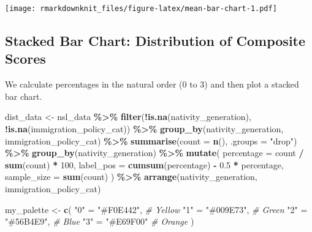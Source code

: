 \documentclass[
]{article}
\newenvironment{Shaded}{\begin{snugshade}}{\end{snugshade}}
\newcommand{\AttributeTok}[1]{\textcolor[rgb]{0.13,0.29,0.53}{#1}}
\newcommand{\CommentTok}[1]{\textcolor[rgb]{0.56,0.35,0.01}{\textit{#1}}}
\newcommand{\DecValTok}[1]{\textcolor[rgb]{0.00,0.00,0.81}{#1}}
\newcommand{\FloatTok}[1]{\textcolor[rgb]{0.00,0.00,0.81}{#1}}
\newcommand{\FunctionTok}[1]{\textcolor[rgb]{0.13,0.29,0.53}{\textbf{#1}}}
\newcommand{\NormalTok}[1]{#1}
\newcommand{\OtherTok}[1]{\textcolor[rgb]{0.56,0.35,0.01}{#1}}
\newcommand{\SpecialCharTok}[1]{\textcolor[rgb]{0.81,0.36,0.00}{\textbf{#1}}}
\newcommand{\StringTok}[1]{\textcolor[rgb]{0.31,0.60,0.02}{#1}}
\begin{document}
\texttt{[image: rmarkdownknit\_files/figure-latex/mean-bar-chart-1.pdf]}

\subsection{Stacked Bar Chart: Distribution of Composite
Scores}\label{stacked-bar-chart-distribution-of-composite-scores}

We calculate percentages in the natural order (0 to 3) and then plot a
stacked bar chart.

\begin{Shaded}
\begin{Highlighting}[]
\NormalTok{dist\_data }\OtherTok{\textless{}{-}}\NormalTok{ nsl\_data }\SpecialCharTok{\%\textgreater{}\%}
  \FunctionTok{filter}\NormalTok{(}\SpecialCharTok{!}\FunctionTok{is.na}\NormalTok{(nativity\_generation), }\SpecialCharTok{!}\FunctionTok{is.na}\NormalTok{(immigration\_policy\_cat)) }\SpecialCharTok{\%\textgreater{}\%}
  \FunctionTok{group\_by}\NormalTok{(nativity\_generation, immigration\_policy\_cat) }\SpecialCharTok{\%\textgreater{}\%}
  \FunctionTok{summarise}\NormalTok{(}\AttributeTok{count =} \FunctionTok{n}\NormalTok{(), }\AttributeTok{.groups =} \StringTok{"drop"}\NormalTok{) }\SpecialCharTok{\%\textgreater{}\%}
  \FunctionTok{group\_by}\NormalTok{(nativity\_generation) }\SpecialCharTok{\%\textgreater{}\%}
  \FunctionTok{mutate}\NormalTok{(}
    \AttributeTok{percentage =}\NormalTok{ count }\SpecialCharTok{/} \FunctionTok{sum}\NormalTok{(count) }\SpecialCharTok{*} \DecValTok{100}\NormalTok{,}
    \AttributeTok{label\_pos =} \FunctionTok{cumsum}\NormalTok{(percentage) }\SpecialCharTok{{-}} \FloatTok{0.5} \SpecialCharTok{*}\NormalTok{ percentage,}
    \AttributeTok{sample\_size =} \FunctionTok{sum}\NormalTok{(count)}
\NormalTok{  ) }\SpecialCharTok{\%\textgreater{}\%}
  \FunctionTok{arrange}\NormalTok{(nativity\_generation, immigration\_policy\_cat)}

\NormalTok{my\_palette }\OtherTok{\textless{}{-}} \FunctionTok{c}\NormalTok{(}
  \StringTok{"0"} \OtherTok{=} \StringTok{"\#F0E442"}\NormalTok{,  }\CommentTok{\# Yellow}
  \StringTok{"1"} \OtherTok{=} \StringTok{"\#009E73"}\NormalTok{,  }\CommentTok{\# Green}
  \StringTok{"2"} \OtherTok{=} \StringTok{"\#56B4E9"}\NormalTok{,  }\CommentTok{\# Blue}
  \StringTok{"3"} \OtherTok{=} \StringTok{"\#E69F00"}   \CommentTok{\# Orange}
\NormalTok{)}


\end{Highlighting}
\end{Shaded}
\end{document}
